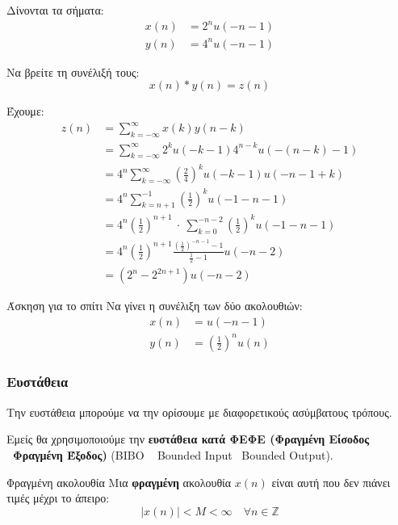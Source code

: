 \documentclass[11pt,a4paper,notitlepage,fleqn,draft]{article}
\begin{document}
\begin{exercise}
	Δίνονται τα σήματα:
	\begin{align*}
	x(n) &= 2^n u(-n-1)\\
	y(n) &= 4^n u(-n-1)
	\end{align*}
	
	Να βρείτε τη συνέλιξή τους:
	\[
	x(n) * y(n) = z(n)
	\]
	
	\tcblower
	Έχουμε:
	\begin{align*}
		z(n) &= \sum_{k=-\infty}^{\infty} x(k)y(n-k)
		\\ &= \sum_{k=-\infty}^{\infty}
		2^k u(-k-1) 4^{n-k} u \left(-(n-k)-1\right)
		\\ &= 4^n\sum_{k=-\infty}^{\infty}\left(\frac{2}{4}\right)^k u(-k-1)u(-n-1+k)
		\\ &= 4^n\sum_{k=n+1}^{-1} \left(\frac{1}{2}\right)^k u(-1-n-1)
		\\ &= 4^n\left(\frac{1}{2}\right)^{n+1}\ \cdot \ \sum_{k=0}^{-n-2}\left(\frac{1}{2}\right)^k
		u(-1-n-1)
		\\ &= 4^n \left(\frac{1}{2}\right)^{n+1}
		\frac{\left(\frac{1}{2}\right)^{-n-1}-1}{\frac{1}{2}-1}u(-n-2)
		\\ &= \left(2^n-2^{2n+1}\right)u(-n-2)
	\end{align*}
\end{exercise}

\begin{questionbox}{Άσκηση για το σπίτι}
	Να γίνει η συνέλιξη των δύο ακολουθιών:
	\begin{align*}
		x(n) &= u(-n-1)\\
		y(n) &= \left(\frac{1}{2}\right)^n u(n)
	\end{align*}
\end{questionbox}


\subsubsection{Ευστάθεια}
Την ευστάθεια μπορούμε να την ορίσουμε με διαφορετικούς ασύμβατους τρόπους.

Εμείς θα χρησιμοποιούμε την \textbf{ευστάθεια κατά ΦΕΦΕ (Φραγμένη Είσοδος \textendash~Φραγμένη Έξοδος)} (BIBO \textemdash~ Bounded Input \textendash~Bounded Output).

\begin{defn}{Φραγμένη ακολουθία}{}
	Μια \textbf{φραγμένη} ακολουθία \( x(n) \) είναι αυτή που δεν πιάνει τιμές μέχρι το άπειρο:
	\[
	\left|x(n)\right| < M < \infty \quad \forall n \in \mathbb Z
	\]
\end{defn}
\end{document}
